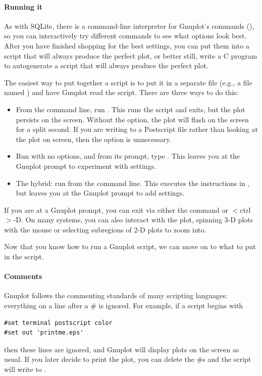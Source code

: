\paragraph{Running it}
As with SQLite, there is a command-line interpreter for Gnuplot's
commands (), so you can
interactively try different  commands to see what options look
best. After you have finished shopping for the best settings, you can
put them into a script that will always produce the perfect plot, or
better still, write a C program to autogenerate a script that will
always produce the perfect plot.

The easiest way to put together a script is to put it in a separate file
(e.g., a file named ) and have Gnuplot read the script. There
are three ways to do this:
\begin{itemize}
\item From the command line, run . This runs
the script and exits, but the plot persists on the screen. Without the
 option, the plot will flash on the screen for a split
second. If you are writing to a Postscript file rather than looking at
the plot on screen, then the  option is unnecessary.
\item Run  with no options, and from its prompt, type . This leaves you at the Gnuplot prompt to experiment with settings.
\item The hybrid: run  from the command line. This
executes the instructions in , but  leaves you at the Gnuplot
prompt to add settings.
\end{itemize}

If you are at a Gnuplot prompt, you can exit via either the 
command or $<$ctrl$>$-D. On many systems, you can also interact with the plot,
spinning 3-D plots with the mouse or selecting subregions of 2-D plots
to zoom into.


Now that you know how to run a Gnuplot script, we can move on to what
to put in the script.

\paragraph{Comments} 
Gnuplot follows the commenting standards of many scripting languages:
everything on a line after a \# is ignored. For example, if a script
begins with
\begin{lstlisting}
#set terminal postscript color
#set out 'printme.eps'
\end{lstlisting}
then these lines are ignored, and Gnuplot will display plots on the
screen as usual. If you later decide to print the plot, you can delete
the \#s and the script will write to .


